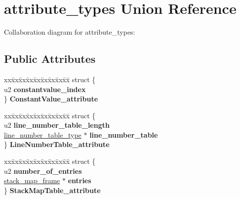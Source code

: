 \hypertarget{unionattribute__types}{}\section{attribute\+\_\+types Union Reference}
\label{unionattribute__types}


Collaboration diagram for attribute\+\_\+types\+:
\subsection*{Public Attributes}
\begin{DoxyCompactItemize}
\item 
\begin{tabbing}
xx\=xx\=xx\=xx\=xx\=xx\=xx\=xx\=xx\=\kill
struct \{\\
\>u2 {\bfseries constantvalue\_index}\\
\} {\bfseries ConstantValue\_attribute}\hypertarget{unionattribute__types_aaecd67000fbd2536ca5290a26b0413b0}{}\label{unionattribute__types_aaecd67000fbd2536ca5290a26b0413b0}
\\

\end{tabbing}\item 
\begin{tabbing}
xx\=xx\=xx\=xx\=xx\=xx\=xx\=xx\=xx\=\kill
struct \{\\
\>u2 {\bfseries line\_number\_table\_length}\\
\>\hyperlink{structline__number__table__type}{line\_number\_table\_type} $\ast$ {\bfseries line\_number\_table}\\
\} {\bfseries LineNumberTable\_attribute}\hypertarget{unionattribute__types_ac8d1e9ca062ca40620b53e65d67b78fd}{}\label{unionattribute__types_ac8d1e9ca062ca40620b53e65d67b78fd}
\\

\end{tabbing}\item 
\begin{tabbing}
xx\=xx\=xx\=xx\=xx\=xx\=xx\=xx\=xx\=\kill
struct \{\\
\>u2 {\bfseries number\_of\_entries}\\
\>\hyperlink{structstack__map__frame}{stack\_map\_frame} $\ast$ {\bfseries entries}\\
\} {\bfseries StackMapTable\_attribute}\hypertarget{unionattribute__types_af40b8d96b4ed7c185e3bbe69ce26d920}{}\label{unionattribute__types_af40b8d96b4ed7c185e3bbe69ce26d920}
\\


\end{tabbing}
\end{DoxyCompactItemize}
